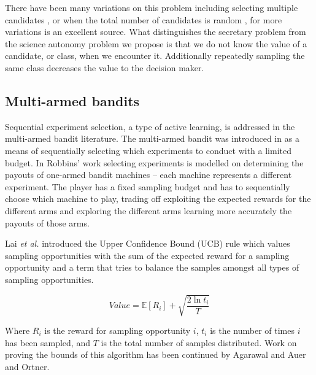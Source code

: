 There have been many variations on this problem including selecting multiple
candidates \cite{vanderbei1980optimal}, or when the total number of candidates
is random \cite{presman1972best}, for more variations \cite{ferguson1989solved}
is an excellent source.  What distinguishes the secretary problem from the
science autonomy problem we propose is that we do not know the value of a
candidate, or class, when we encounter it.  Additionally repeatedly sampling
the same class decreases the value to the decision maker. 


% 

\subsection{Multi-armed bandits}

Sequential experiment selection, a type of active learning, is addressed in the
multi-armed bandit literature.  The multi-armed bandit was introduced in
\cite{robbins1952some} as a means of sequentially selecting which experiments
to conduct with a limited budget.  In Robbins' work \cite{robbins1952some}
selecting experiments is modelled on determining the payouts of one-armed
bandit machines -- each machine represents a different experiment.  The player
has a fixed sampling budget and has to sequentially choose which machine to
play, trading off exploiting the expected rewards for the different arms and
exploring the different arms learning more accurately the payouts of those
arms.  

Lai \emph{et al.} \cite{lai1985asymptotically} introduced the Upper Confidence
Bound (UCB) rule which values sampling opportunities with the sum of the
expected reward for a sampling opportunity and a term that tries to balance the
samples amongst all types of sampling opportunities.

$$
Value = \mathbb{E}\left[R_i\right] + \sqrt{\frac{2\ln t_i}{T}}
$$

Where $R_i$ is the reward for sampling opportunity $i$, $t_i$ is the number of
times $i$ has been sampled, and $T$ is the total number of samples distributed.
Work on proving the bounds of this algorithm has been continued by Agarawal
\cite{agrawal1995sample} and Auer and Ortner\cite{auer2010ucb}.  



